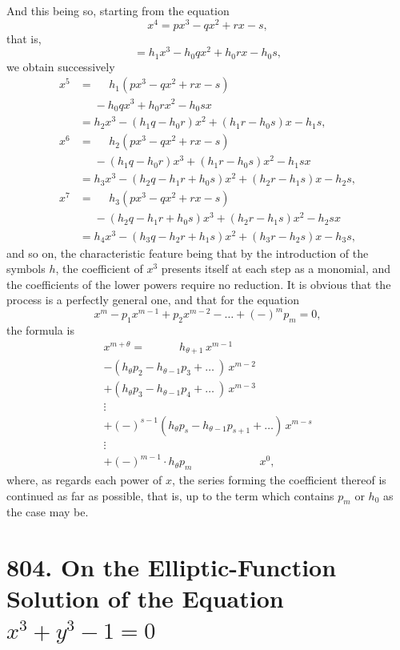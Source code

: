 \documentclass[11pt,a4paper]{book}
\begin{document}
And this being so, starting from the equation
\[
x^4 = px^3 - qx^2 + rx - s,
\]
that is,
\[
= h_1 x^3 - h_0 qx^2 + h_0 rx - h_0 s,
\]
we obtain successively
\begin{align*}
x^5 &= \phantom{=} h_1(px^3 - qx^2 + rx - s) \\
&\phantom{=} {}- h_0 qx^3 + h_0 rx^2 - h_0 sx \\
&= h_2 x^3 - (h_1 q - h_0 r)x^2 + (h_1 r - h_0 s)x - h_1 s,\\[0.5em]
x^6 &= \phantom{=} h_2(px^3 - qx^2 + rx - s) \\
&\phantom{=} {}- (h_1 q - h_0 r)x^3 + (h_1 r - h_0 s)x^2 - h_1 sx \\
&= h_3 x^3 - (h_2 q - h_1 r + h_0 s)x^2 + (h_2 r - h_1 s)x - h_2 s,\\[0.5em]
x^7 &= \phantom{=} h_3(px^3 - qx^2 + rx - s) \\
&\phantom{=} {}- (h_2 q - h_1 r + h_0 s)x^3 + (h_2 r - h_1 s)x^2 - h_2 sx \\
&= h_4 x^3 - (h_3 q - h_2 r + h_1 s)x^2 + (h_3 r - h_2 s)x - h_3 s,
\end{align*}
and so on, the characteristic feature being that by the introduction of the symbols $h$, the coefficient of $x^3$ presents itself at each step as a monomial, and the coefficients of the lower powers require no reduction. It is obvious that the process is a perfectly general one, and that for the equation
\[
x^m - p_1 x^{m-1} + p_2 x^{m-2} - \ldots + (-)^m p_m = 0,
\]
the formula is
\begin{multline*}
x^{m+\theta} = \qquad\quad h_{\theta+1}\,x^{m-1} \\
- (h_\theta p_2 - h_{\theta-1} p_3 + \ldots\ )\,x^{m-2} \\
+ (h_\theta p_3 - h_{\theta-1} p_4 + \ldots\ )\,x^{m-3} \\
\vdots \\
+ (-)^{s-1}(h_\theta p_s - h_{\theta-1} p_{s+1} + \ldots)\,x^{m-s} \\
\vdots \\
+ (-)^{m-1}\cdot h_\theta p_m \qquad\qquad\qquad x^0,
\end{multline*}
where, as regards each power of $x$, the series forming the coefficient thereof is continued as far as possible, that is, up to the term which contains $p_m$ or $h_0$ as the case may be.


\newpage
\section*{804. On the Elliptic-Function Solution of the Equation $x^3 + y^3 - 1 = 0$}
\end{document}
